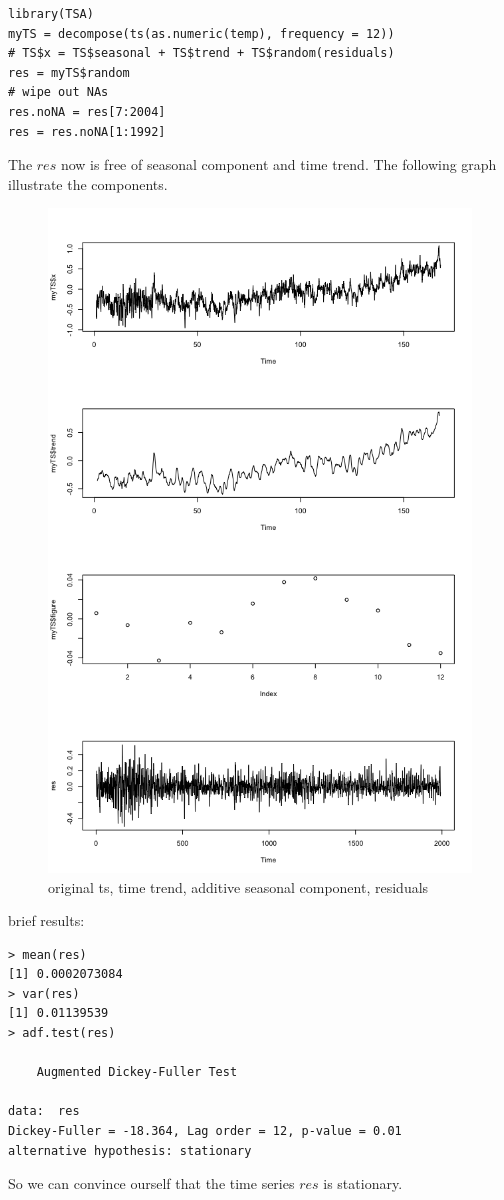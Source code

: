 \documentclass[a4paper, 11pt]{article}
\begin{document}
\begin{verbatim}
library(TSA)
myTS = decompose(ts(as.numeric(temp), frequency = 12))
# TS$x = TS$seasonal + TS$trend + TS$random(residuals) 
res = myTS$random
# wipe out NAs
res.noNA = res[7:2004] 
res = res.noNA[1:1992]
\end{verbatim}
\indent The $res$ now is free of seasonal component and time trend. The following graph illustrate the components.
\begin{figure}[H]
\centering
\caption{original ts, time trend, additive seasonal component, residuals}
\includegraphics[scale=.50]{component.png}
\end{figure}

\indent brief results:
\begin{verbatim}
> mean(res)
[1] 0.0002073084
> var(res)
[1] 0.01139539
> adf.test(res)

	Augmented Dickey-Fuller Test

data:  res
Dickey-Fuller = -18.364, Lag order = 12, p-value = 0.01
alternative hypothesis: stationary
\end{verbatim}
\indent So we can convince ourself that the time series $res$ is stationary.
\end{document}

